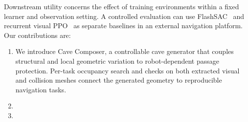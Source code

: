 Downstream utility concerns the effect of training environments within a fixed
learner and observation setting. A controlled evaluation can use
FlashSAC~\cite{kim2026flashsac} and recurrent visual
PPO~\cite{schulman2017ppo} as separate baselines in an external navigation
platform.
Our contributions are:
\begin{enumerate}
\item We introduce Cave Composer, a controllable cave generator that couples
structural and local geometric variation to robot-dependent passage protection.
Per-task occupancy search and checks on both extracted visual and collision
meshes connect the generated geometry to reproducible navigation tasks.
\item {}
\item {}
\end{enumerate}
